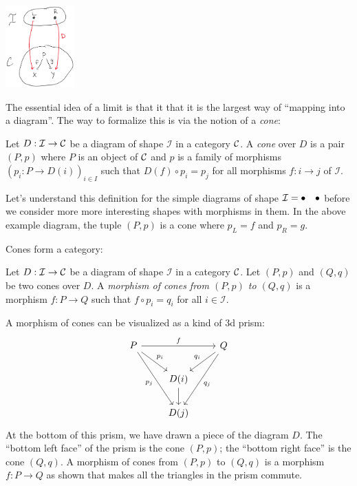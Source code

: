 \begin{center}
  \includegraphics[width=100px]{fig/diagram-1.png}
\end{center}

The essential idea of a limit is that it that it is the largest way of ``mapping 
into a diagram''. 
The way to formalize this is via the notion of a \emph{cone}:

\begin{definition}[Cone]
  \sloppy
  Let \(D : \mathcal I \to \mathcal C\) be a diagram of shape \(\mathcal I\)
  in a category \(\mathcal C\).
  A \emph{cone} over \(D\) is a pair \((P,p)\)
  where \(P\) is an object of \(\mathcal C\)
  and \(p\) is a family of morphisms \((p_i : P \to D(i))_{i\in I}\)
  such that \(D(f) \circ p_i = p_j\) for all morphisms \(f : i \to j\)
  of \(\mathcal I\).
\end{definition}

Let's understand this definition for the simple diagrams of shape $\mathcal I =
\bullet \quad \bullet$ before we consider more more interesting shapes with
morphisms in them. In the above example diagram, the tuple $(P, p)$
is a cone where $p_L = f$ and $p_R = g$.


Cones form a category:
\begin{definition}
  Let \(D : \mathcal I \to \mathcal C\) be a diagram of shape \(\mathcal I\)
  in a category \(\mathcal C\).
  Let \((P,p)\) and \((Q,q)\) be two cones over \(D\).
  A \emph{morphism of cones from \((P,p)\) to \((Q,q)\)}
  is a morphism \(f : P \to Q\) such that \(f \circ p_i = q_i\)
  for all \(i \in \mathcal I\).
\end{definition}
A morphism of cones can be visualized as a kind of 3d prism:
\[%
\begin{tikzcd}
P \arrow[rr, "f"] \arrow[rd, "p_i"] \arrow[rdd, "p_j"'] &                & Q \arrow[ld, "q_i"'] \arrow[ldd, "q_j"] \\
                                                        & D(i) \arrow[d] &                                         \\
                                                        & D(j)           &
\end{tikzcd}\]
At the bottom of this prism, we have drawn a piece of the diagram \(D\).
The ``bottom left face'' of the prism is the cone \((P,p)\); the ``bottom right face'' is the cone \((Q,q)\).
A morphism of cones from \((P,p)\) to \((Q,q)\) is a morphism \(f : P \to Q\) as shown
that makes all the triangles in the prism commute.

